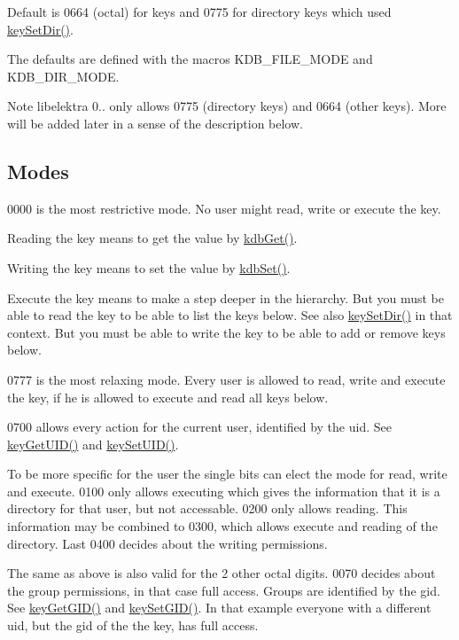 Default is 0664 (octal) for keys and 0775 for directory keys which used \hyperlink{group__meta_gaae575bd86a628a15ee45baa860522e75}{key\-Set\-Dir()}.

The defaults are defined with the macros K\-D\-B\-\_\-\-F\-I\-L\-E\-\_\-\-M\-O\-D\-E and K\-D\-B\-\_\-\-D\-I\-R\-\_\-\-M\-O\-D\-E.

\begin{DoxyNote}{Note}
libelektra 0.. only allows 0775 (directory keys) and 0664 (other keys). More will be added later in a sense of the description below.
\end{DoxyNote}
\hypertarget{group__meta_mode}{}\subsection{Modes}\label{group__meta_mode}
0000 is the most restrictive mode. No user might read, write or execute the key.

Reading the key means to get the value by \hyperlink{group__kdb_ga28e385fd9cb7ccfe0b2f1ed2f62453a1}{kdb\-Get()}.

Writing the key means to set the value by \hyperlink{group__kdb_ga11436b058408f83d303ca5e996832bcf}{kdb\-Set()}.

Execute the key means to make a step deeper in the hierarchy. But you must be able to read the key to be able to list the keys below. See also \hyperlink{group__meta_gaae575bd86a628a15ee45baa860522e75}{key\-Set\-Dir()} in that context. But you must be able to write the key to be able to add or remove keys below.

0777 is the most relaxing mode. Every user is allowed to read, write and execute the key, if he is allowed to execute and read all keys below.

0700 allows every action for the current user, identified by the uid. See \hyperlink{group__meta_gacaa5060e67b03f50ae49a3620c54bc46}{key\-Get\-U\-I\-D()} and \hyperlink{group__meta_gab5f284f5ecd261e0a290095f50ba1af7}{key\-Set\-U\-I\-D()}.

To be more specific for the user the single bits can elect the mode for read, write and execute. 0100 only allows executing which gives the information that it is a directory for that user, but not accessable. 0200 only allows reading. This information may be combined to 0300, which allows execute and reading of the directory. Last 0400 decides about the writing permissions.

The same as above is also valid for the 2 other octal digits. 0070 decides about the group permissions, in that case full access. Groups are identified by the gid. See \hyperlink{group__meta_ga46a95e81d7d7f4e3eb59e60e5f3738c0}{key\-Get\-G\-I\-D()} and \hyperlink{group__meta_ga9e3d0fb3f7ba906e067727b9155d22e3}{key\-Set\-G\-I\-D()}. In that example everyone with a different uid, but the gid of the the key, has full access.

